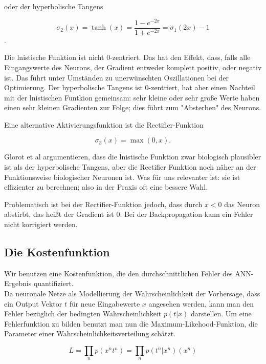 oder der hyperbolische Tangens

\begin{equation}
\sigma_2(x) = \tanh(x) = \frac{1-e^{-2x}}{1+e^{-2x}} = 
\sigma_1(2x) -1
\end{equation}.

Die lnistische Funktion ist nicht 0-zentriert. Das hat den Effekt, dass, falls alle Eingangswerte des Neurons, der Gradient entweder komplett positiv, oder negativ ist. Das führt unter Umständen zu unerwünschten Oszillationen bei der Optimierung. Der hyperbolische Tangens ist 0-zentriert, hat aber einen Nachteil mit der lnistischen Funtkion gemeinsam: sehr kleine oder sehr große Werte haben einen sehr kleinen Gradienten zur Folge; dies führt zum "Absterben" des Neurons. 

Eine alternative Aktivierungsfunktion ist die Rectifier-Funktion 

\begin{equation}
\sigma_3(x) = \max(0,x).
\end{equation} 

Glorot et al argumentieren, dass die lnistische Funktion zwar biologisch plausibler ist als der hyperbolische Tangens, aber die Rectifier Funktion noch näher an der Funktionsweise biologischer Neuronen ist. Was für uns relevanter ist: sie ist effizienter zu berechnen; also in der Praxis oft eine bessere Wahl. \cite{glorot2011deep}

Problematisch ist bei der Rectifier-Funktion jedoch, dass durch $x < 0$ das Neuron abstirbt, das heißt der Gradient ist 0: Bei der Backpropagation kann ein Fehler nicht korrigiert werden. \cite{bengio2012practical}


\subsection{Die Kostenfunktion}
Wir benutzen eine Kostenfunktion, die den durchschnittlichen Fehler des ANN-Ergebnis quantifiziert.\\

Da neuronale Netze als Modellierung der Wahrscheinlichkeit der Vorhersage, dass ein Output Vektor $t$ für neue Eingabewerte $x$ angesehen werden, kann man den Fehler bezüglich der bedingten Wahrscheinlichkeit $p(t|x)$ darstellen. 
Um eine Fehlerfunktion zu bilden benutzt man nun die Maximum-Likehood-Funktion, die Parameter einer Wahrscheinlichkeitsverteilung schätzt. 

\begin{equation}
L = \prod_n p(x^n t^n) = \prod_n p(t^n|x^n) (x^n) 
\end{equation}

